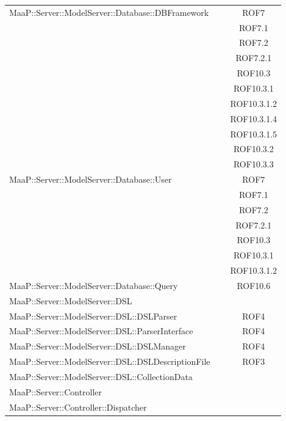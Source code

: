 \begin{center}
\begin{longtable}{|p{0.8\linewidth}|c|}
\midrule 
MaaP::Server::ModelServer::Database::DBFramework
& ROF7\\
& ROF7.1\\
& ROF7.2\\
& ROF7.2.1\\
& ROF10.3\\
& ROF10.3.1\\
& ROF10.3.1.2\\
& ROF10.3.1.4\\
& ROF10.3.1.5\\
& ROF10.3.2\\
& ROF10.3.3\\


\midrule 
MaaP::Server::ModelServer::Database::User
& ROF7\\
& ROF7.1\\
& ROF7.2\\
& ROF7.2.1\\
& ROF10.3\\
& ROF10.3.1\\
& ROF10.3.1.2\\

\midrule 
MaaP::Server::ModelServer::Database::Query
& ROF10.6\\

\midrule 
MaaP::Server::ModelServer::DSL
& \\

\midrule 
MaaP::Server::ModelServer::DSL::DSLParser
& ROF4\\

\midrule 
MaaP::Server::ModelServer::DSL::ParserInterface
& ROF4\\

\midrule 
MaaP::Server::ModelServer::DSL::DSLManager
& ROF4\\

\midrule 
MaaP::Server::ModelServer::DSL::DSLDescriptionFile
& ROF3\\

\midrule 
MaaP::Server::ModelServer::DSL::CollectionData
& \\

\midrule 
MaaP::Server::Controller 
& \\

\midrule 
MaaP::Server::Controller::Dispatcher
& \\


\end{longtable}
\end{center}
